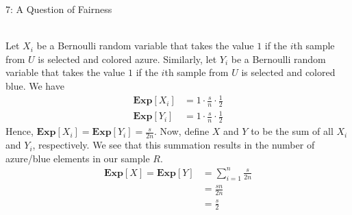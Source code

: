 \documentclass[12pt]{article}
\begin{document}
\begin{solution}
\begin{problem}{7: A Question of Fairness}
\end{problem}
\begin{solution} \ \\
Let $X_i$ be a Bernoulli random variable that takes the value $1$ if the $i$th sample from $U$ is selected and colored azure. Similarly, let $Y_i$ be a Bernoulli random variable that takes the value $1$ if the $i$th sample from $U$ is selected and colored blue. We have
\begin{align*}
    \textbf{Exp}[X_i] &= 1 \cdot \frac{s}{n} \cdot \frac{1}{2} \\
    \textbf{Exp}[Y_i] &= 1 \cdot \frac{s}{n} \cdot \frac{1}{2}
\end{align*}
Hence, $\textbf{Exp}[X_i] = \textbf{Exp}[Y_i] = \frac{s}{2n}$. Now, define $X$ and $Y$ to be the sum of all $X_i$ and $Y_i$, respectively. We see that this summation results in the number of azure/blue elements in our sample $R$.
\begin{align*}
    \textbf{Exp}[X] = \textbf{Exp}[Y] &= \sum\limits_{i=1}^n \frac{s}{2n} \\
    &= \frac{sn}{2n} \\
    &= \frac{s}{2}
\end{align*}


\end{solution}
\end{solution}
\end{document}
